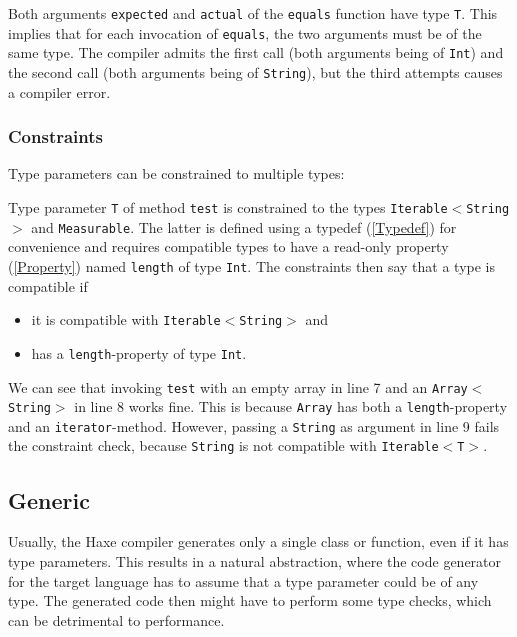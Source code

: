 \documentclass{article}
\newcommand{\type}[1]{\texttt{#1}}
\newcommand{\expr}[1]{\texttt{#1}}
\newcommand{\tref}[2]{#1 (\ref{#2})}
\begin{document}

Both arguments \expr{expected} and \expr{actual} of the \expr{equals} function have type \type{T}. This implies that for each invocation of \expr{equals}, the two arguments must be of the same type. The compiler admits the first call (both arguments being of \type{Int}) and the second call (both arguments being of \type{String}), but the third attempts causes a compiler error.


\subsubsection{Constraints}
\label{Constraints}

Type parameters can be constrained to multiple types:


Type parameter \type{T} of method \expr{test} is constrained to the types \type{Iterable$<$String$>$} and \type{Measurable}. The latter is defined using a \tref{typedef}{Typedef} for convenience and requires compatible types to have a read-only \tref{property}{Property} named \expr{length} of type \type{Int}. The constraints then say that a type is compatible if

\begin{itemize}
	\item it is compatible with \type{Iterable$<$String$>$} and
	\item has a \expr{length}-property of type \type{Int}.
\end{itemize}
We can see that invoking \expr{test} with an empty array in line 7 and an \type{Array$<$String$>$} in line 8 works fine. This is because \type{Array} has both a \expr{length}-property and an \expr{iterator}-method. However, passing a \type{String} as argument in line 9 fails the constraint check, because \type{String} is not compatible with \type{Iterable$<$T$>$}. 


\subsection{Generic}
\label{Generic}

Usually, the Haxe compiler generates only a single class or function, even if it has type parameters. This results in a natural abstraction, where the code generator for the target language has to assume that a type parameter could be of any type. The generated code then might have to perform some type checks, which can be detrimental to performance.
\end{document}
